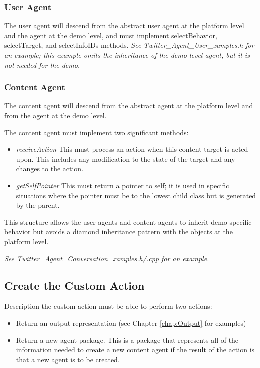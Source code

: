 \subsubsection {User Agent}
\par The user agent will descend from the abstract user agent at the platform level and the agent at the demo level, and must implement selectBehavior, selectTarget, and selectInfoIDs methods. \textit{See Twitter\_Agent\_User\_xamples.h for an example; this example omits the inheritance of the demo level agent, but it is not needed for the demo.}

\subsubsection {Content Agent}
\par The content agent will descend from the abstract agent at the platform level and from the agent at the demo level. 

The content agent must implement two significant methods:

\begin{itemize}
\item \textit{receiveAction} This must process an action when this content target is acted upon. This includes any modification to the state of the target and any changes to the action.
\item \textit{getSelfPointer} This must return a pointer to self; it is used in specific situations where the pointer must be to the lowest child class but is generated by the parent. 
\end{itemize}

\par This structure allows the user agents and content agents to inherit demo specific behavior but avoids a diamond inheritance pattern with the objects at the platform level.

\textit{See Twitter\_Agent\_Conversation\_xamples.h/.cpp for an example.}

\subsection{Create the Custom Action}
Description the custom action must be able to perform two actions:

\begin{itemize}
\item Return an output representation (see Chapter \ref{chap:Output} for examples)
\item Return a new agent package. This is a package that represents all of the information needed to create a new content agent if the result of the action is that a new agent is to be created.
\end{itemize}

